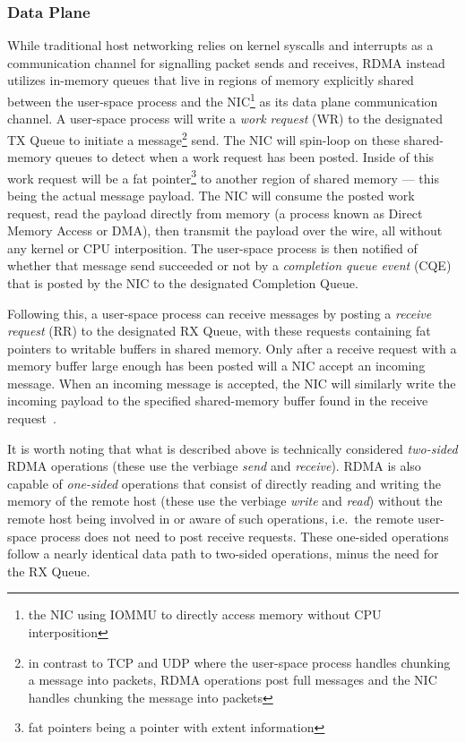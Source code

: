 \documentclass[12pt,titlepage]{article}
\begin{document}
\subsubsection{Data Plane}
While traditional host networking relies on kernel syscalls and interrupts as a communication channel for signalling packet sends and receives, RDMA instead utilizes in-memory queues that live in regions of memory explicitly shared between the user-space process and the NIC\footnote{the NIC using IOMMU to directly access memory without CPU interposition} as its data plane communication channel.
A user-space process will write a \textit{work request} (WR) to the designated TX Queue to initiate a message\footnote{in contrast to TCP and UDP where the user-space process handles chunking a message into packets, RDMA operations post full messages and the NIC handles chunking the message into packets} send.
The NIC will spin-loop on these shared-memory queues to detect when a work request has been posted.
Inside of this work request will be a fat pointer\footnote{fat pointers being a pointer with extent information} to another region of shared memory --- this being the actual message payload.
The NIC will consume the posted work request, read the payload directly from memory (a process known as Direct Memory Access or DMA), then transmit the payload over the wire, all without any kernel or CPU interposition.
The user-space process is then notified of whether that message send succeeded or not by a \textit{completion queue event} (CQE) that is posted by the NIC to the designated Completion Queue.

Following this, a user-space process can receive messages by posting a \textit{receive request} (RR) to the designated RX Queue, with these requests containing fat pointers to writable buffers in shared memory.
Only after a receive request with a memory buffer large enough has been posted will a NIC accept an incoming message.
When an incoming message is accepted, the NIC will similarly write the incoming payload to the specified shared-memory buffer found in the receive request~\cite{rdmaawareprogramming}.

It is worth noting that what is described above is technically considered \textit{two-sided} RDMA operations (these use the verbiage \textit{send} and \textit{receive}).
RDMA is also capable of \textit{one-sided} operations that consist of directly reading and writing the memory of the remote host (these use the verbiage \textit{write} and \textit{read}) without the remote host being involved in or aware of such operations, i.e.\ the remote user-space process does not need to post receive requests.
These one-sided operations follow a nearly identical data path to two-sided operations, minus the need for the RX Queue.
\end{document}
